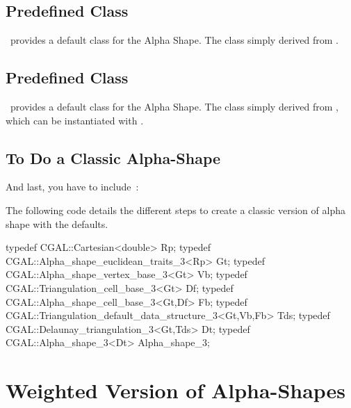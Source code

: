
\subsection*{Predefined \protect {} Class}

\cgal\ provides a default  class
for the Alpha Shape. The class
 simply derived from 
.


\subsection*{Predefined \protect {} Class}

\cgal\ provides a default  class
for the Alpha Shape. The class
 simply derived from 
, which can be instantiated with .



\subsection*{To Do a Classic Alpha-Shape}

And last, you have to include~:


\ccExample
The following code details the different steps to create 
a classic version of alpha shape with the defaults.

\begin{cprog}
typedef CGAL::Cartesian<double> Rp;
typedef CGAL::Alpha_shape_euclidean_traits_3<Rp> Gt;
typedef CGAL::Alpha_shape_vertex_base_3<Gt> Vb;
typedef CGAL::Triangulation_cell_base_3<Gt> Df;
typedef CGAL::Alpha_shape_cell_base_3<Gt,Df> Fb;
typedef CGAL::Triangulation_default_data_structure_3<Gt,Vb,Fb> Tds;
typedef CGAL::Delaunay_triangulation_3<Gt,Tds> Dt;
typedef CGAL::Alpha_shape_3<Dt> Alpha_shape_3;
\end{cprog}


\section{Weighted Version of Alpha-Shapes\label{I1_SectWeightedAS3D}}

